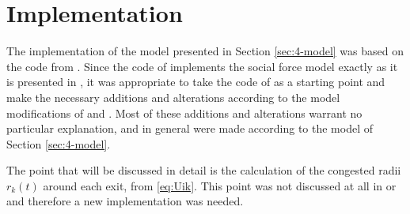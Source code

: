 \section{Implementation}
The implementation of the model presented in Section \ref{sec:4-model} was based on the code from \cite{Hardmeier2012}. Since the code of \cite{Hardmeier2012} implements the social force model exactly as it is presented in \cite{Helbing2000}, it was appropriate to take the code of \cite{Hardmeier2012} as a starting point and make the necessary additions and alterations according to the model modifications of \cite{Zainuddin2010} and \cite{Wang2016}. Most of these additions and alterations warrant no particular explanation, and in general were made according to the model of Section \ref{sec:4-model}.

The point that will be discussed in detail is the calculation of the congested radii $r_k(t)$ around each exit, from \eqref{eq:Uik}. This point was not discussed at all in \cite{Zainuddin2010} or \cite{Wang2016} and therefore a new implementation was needed.